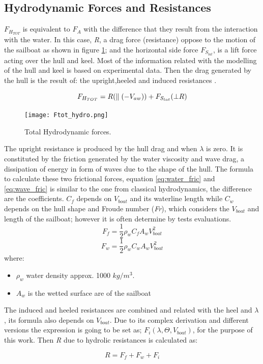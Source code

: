 \subsection {Hydrodynamic Forces and Resistances} \label{sec:hydroforces}
$F_{H_{TOT}}$ is equivalent to $F_{A}$ with the difference that they result from the interaction with the water. In this case, \textit{R}, a drag force (resistance) oppose to the motion of the sailboat as shown in figure \ref{fig:Ftot_hydro}; and the horizontal side force $F_{S_{lat}}$, is a lift force acting over the hull and keel. Most of the information related with the modelling of the hull and keel is based on experimental data.%
Then the drag generated by the hull is the result of: the  upright,heeled and induced resistances \cite{philpott1993yacht}.\par
\begin{equation}
    F_{H_{TOT}}=R(\parallel( -V_{aw})) + F_{S_{lat}}(\bot R )\\
\end{equation}
\begin{figure}
    \centering
    \texttt{[image: Ftot\_hydro.png]}
    \caption{Total Hydrodynamic forces. \cite{fossati2009aero}}
    \label{fig:Ftot_hydro}
\end{figure}
The upright resistance is produced by the hull drag and when $\lambda$ is zero. It is constituted by the friction generated by the water viscosity and wave drag, a dissipation of energy in form of waves due to the shape of the hull. The formula to calculate these two frictional forces, equation \ref{eq:water_fric} and \ref{eq:wave_fric} is similar to the one from classical hydrodynamics, the difference are the coefficients. $C_{f}$ depends on $V_{boat}$ and its waterline length while $C_{w}$ depends on the hull shape and Froude number (\textit{Fr}), which considers the $V_{boat}$ and length of the sailboat; however it is often determine by tests evaluations.
\begin{equation}\label{eq:water_fric}
 F_{f}=\frac{1}{2}\rho_{w} C_{f} A_{w} V_{boat}^2
\end{equation}
\begin{equation}\label{eq:wave_fric}
 F_{w}=\frac{1}{2}\rho_{w} C_{w} A_{w} V_{boat}^2
\end{equation}
where:
\begin{itemize} \label{R_symbols}
    \item $\rho_{w}$ water density approx. 1000 $kg/m^3$.
    \item $A_{w}$ is the wetted surface are of the sailboat
\end{itemize}
The induced and heeled resistances are combined and related with the heel and $\lambda$, its formula also depends on $V_{boat}$. Due to its complex derivation and different versions the expression is going to be set as; $F_{i}(\lambda,\Theta,V_{boat})$, for the purpose of this work. Then \textit{R} due to hydrolic resistances is calculated as: \par 
\begin{equation} \label{eq:R_total}
    R=F_{f}+F_{w}+F_{i}
\end{equation}

